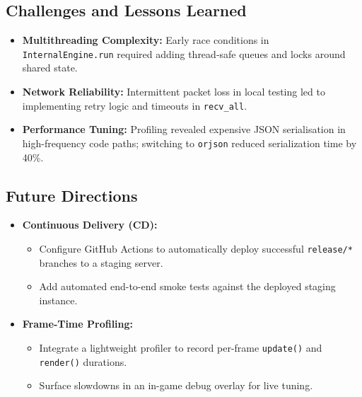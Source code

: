 \documentclass[11pt,a4paper]{article}
\begin{document}
\subsection{Challenges and Lessons Learned}
\begin{itemize}[nosep]
  \item \textbf{Multithreading Complexity:} Early race conditions in \texttt{InternalEngine.run} required adding thread‐safe queues and locks around shared state.  
  \item \textbf{Network Reliability:} Intermittent packet loss in local testing led to implementing retry logic and timeouts in \texttt{recv\_all}.  
  \item \textbf{Performance Tuning:} Profiling revealed expensive JSON serialisation in high-frequency code paths; switching to \texttt{orjson} reduced serialization time by 40\%.
\end{itemize}

\subsection{Future Directions}
\begin{itemize}[nosep]
  \item \textbf{Continuous Delivery (CD):}  
    \begin{itemize}[nosep]
      \item Configure GitHub Actions to automatically deploy successful \texttt{release/*} branches to a staging server.  
      \item Add automated end-to-end smoke tests against the deployed staging instance.
    \end{itemize}

  \item \textbf{Frame‐Time Profiling:}  
    \begin{itemize}[nosep]
      \item Integrate a lightweight profiler to record per-frame \texttt{update()} and \texttt{render()} durations.  
      \item Surface slowdowns in an in-game debug overlay for live tuning.
    \end{itemize}
\end{itemize}
\end{document}
